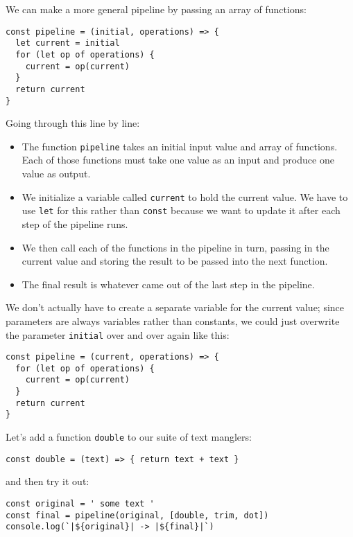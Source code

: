 We can make a more general pipeline by passing an array of functions:

\begin{verbatim}
const pipeline = (initial, operations) => {
  let current = initial
  for (let op of operations) {
    current = op(current)
  }
  return current
}
\end{verbatim}

\noindent
Going through this line by line:

\begin{itemize}
\item
  The function \texttt{pipeline} takes an initial input value and array of functions.
  Each of those functions must take one value as an input and produce one value as output.
\item
  We initialize a variable called \texttt{current} to hold the current value.
  We have to use \texttt{let} for this rather than \texttt{const}
  because we want to update it after each step of the pipeline runs.
\item
  We then call each of the functions in the pipeline in turn,
  passing in the current value and storing the result to be passed into the next function.
\item
  The final result is whatever came out of the last step in the pipeline.
\end{itemize}

We don't actually have to create a separate variable for the current value;
since parameters are always variables rather than constants,
we could just overwrite the parameter \texttt{initial} over and over again like this:

\begin{verbatim}
const pipeline = (current, operations) => {
  for (let op of operations) {
    current = op(current)
  }
  return current
}
\end{verbatim}

Let's add a function \texttt{double} to our suite of text manglers:

\begin{verbatim}
const double = (text) => { return text + text }
\end{verbatim}

\noindent
and then try it out:

\begin{verbatim}
const original = ' some text '
const final = pipeline(original, [double, trim, dot])
console.log(`|${original}| -> |${final}|`)
\end{verbatim}

